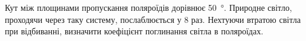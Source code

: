 %
%
^^I^^IКут між площинами пропускання поляроїдів дорівнює \SI{50}{\degree}. Природне світло, проходячи через таку систему, послаблюється у 8 раз. Нехтуючи втратою світла при відбиванні, визначити коефіцієнт поглинання світла в поляроїдах.
